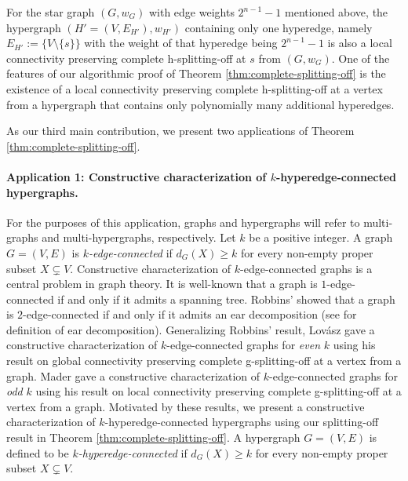 \begin{remark}
For the star graph $(G,w_G)$ with edge weights $2^{n-1}-1$ mentioned above, the hypergraph $(H'=(V, E_{H'}), w_{H'})$ containing only one hyperedge, namely $E_{H'}:=\{V\setminus \{s\}\}$ with the weight of that hyperedge being $2^{n-1}-1$ is also a local connectivity preserving complete h-splitting-off at $s$ from $(G,w_G)$. 
One of the features of our algorithmic proof of Theorem \ref{thm:complete-splitting-off} is the existence of a local connectivity preserving complete h-splitting-off at a vertex from a hypergraph that contains only polynomially many additional hyperedges. 
\end{remark}

As our third main contribution, 
we present two applications of Theorem \ref{thm:complete-splitting-off}. 

\paragraph{Application 1: Constructive characterization of $k$-hyperedge-connected hypergraphs.}
For the purposes of this application, 
graphs and hypergraphs will refer to multi-graphs and multi-hypergraphs, respectively.
Let $k$ be a positive integer. A graph $G=(V, E)$ is \emph{$k$-edge-connected} if $d_{G}(X)\ge k$ for every non-empty proper subset $X\subsetneq V$. 
Constructive characterization of $k$-edge-connected graphs is a central problem in graph theory. 
It is well-known that a graph is $1$-edge-connected if and only if it admits a spanning tree. 
Robbins' \cite{Rob39} showed that a graph is $2$-edge-connected if and only if it admits an ear decomposition (see \cite{Frank-book} for definition of ear decomposition). 
Generalizing Robbins' result, 
Lov\'{a}sz \cite{Lov74, Lovasz-problems-book} gave a constructive characterization of $k$-edge-connected graphs for \emph{even} $k$ using his result on global connectivity preserving complete g-splitting-off at a vertex from a graph. 
Mader \cite{Mad78} gave a constructive characterization of $k$-edge-connected graphs for \emph{odd} $k$ using his result on local connectivity preserving complete g-splitting-off at a vertex from a graph. 
Motivated by these results, we present a constructive characterization of $k$-hyperedge-connected hypergraphs using our splitting-off result in Theorem \ref{thm:complete-splitting-off}.
A hypergraph $G=(V, E)$ is defined to be \emph{$k$-hyperedge-connected} if $d_{G}(X)\ge k$ for every non-empty proper subset $X\subsetneq V$. 


